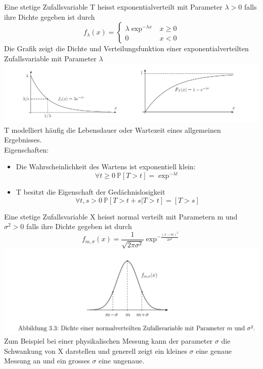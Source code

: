 Eine stetige Zufallsvariable T heisst exponentialverteilt mit Parameter \( \lambda > 0\) falls ihre Dichte gegeben ist durch
\[ f_\lambda(x) = \begin{cases}
    \lambda \exp ^{-\lambda x } & x \geq 0 \\
    0 & x < 0
\end{cases}\]
\Bem[3.28A]
Die Grafik zeigt die Dichte und Verteilungsfunktion einer exponentialverteilten Zufallsvariable mit Parameter \( \lambda\)
\includegraphics[scale=0.2]{exp_Dichte_Verteilung.png} \\ 
T modelliert häufig die Lebensdauer oder Wartezeit eines allgemeinen Ergebnisses. \\
Eigenschaften: \begin{itemize}
    \item Die Wahrscheinlichkeit des Wartens ist exponentiell klein: \[ \forall t \geq 0 \ \mathbb{P}[T > t] = \exp^{-\lambda t }\]
    \item T besitzt die Eigenschaft der Gedächnislosigkeit \[ \forall t,s > 0 \ \mathbb{P}[T > t + s | T > t] = [T > s]\]
\end{itemize}
\Def[3.29] \newline
Eine stetige Zufallsvariable X heisst normal verteilt mit Parametern m und \( \sigma^2 > 0\) falls ihre Dichte gegeben ist durch \[ f_{m,\sigma}(x) = \frac{1}{\sqrt{2 \pi \sigma^2}}\exp^{-\frac{(x-m)^2}{2 \sigma^2}}\]
\Bem[3.29A] \newline
\includegraphics[scale=0.175]{Dichte_Normalverteilung.png} \\
Zum Beispiel bei einer physikalischen Messung kann der parameter \( \sigma\) die Schwankung von X darstellen und generell zeigt ein kleines \(\sigma\) eine genaue Messung an und ein grosses \(\sigma\) eine ungenaue.
